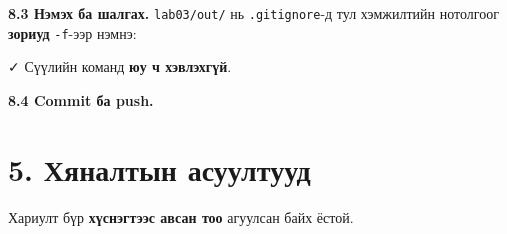 \textbf{8.3 Нэмэх ба шалгах.} \texttt{lab03/out/} нь \texttt{.gitignore}-д тул хэмжилтийн нотолгоог \textbf{зориуд} \texttt{-f}-ээр нэмнэ:

\begin{Shaded}
\begin{Highlighting}[]
\KeywordTok{\textbackslash{}}
\KeywordTok{|} 
\end{Highlighting}
\end{Shaded}

✓ Сүүлийн команд \textbf{юу ч хэвлэхгүй}.

\textbf{8.4 Commit ба push.}

\begin{Shaded}
\begin{Highlighting}[]
\KeywordTok{\&\&} 
\end{Highlighting}
\end{Shaded}

\hypertarget{ux445ux44fux43dux430ux43bux442ux44bux43d-ux430ux441ux443ux443ux43bux442ux443ux443ux434}{%
\section{5. Хяналтын асуултууд}\label{ux445ux44fux43dux430ux43bux442ux44bux43d-ux430ux441ux443ux443ux43bux442ux443ux443ux434}}

Хариулт бүр \textbf{хүснэгтээс авсан тоо} агуулсан байх ёстой.

